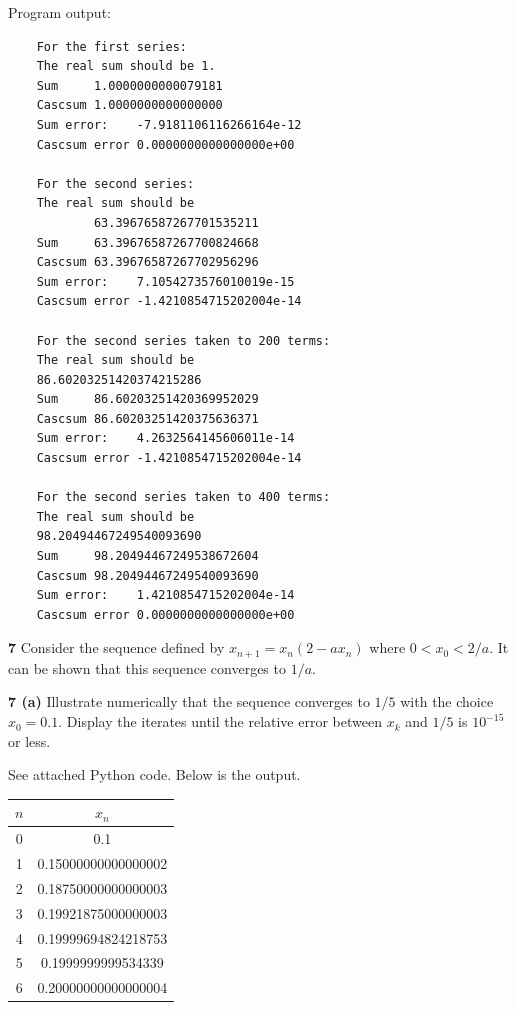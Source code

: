 \documentclass[12pt]{article}
\begin{document}
	\bigbreak
	
	Program output: \\
	\begin{verbatim}
	For the first series:
	The real sum should be 1.
	Sum     1.0000000000079181
	Cascsum 1.0000000000000000
	Sum error:    -7.9181106116266164e-12
	Cascsum error 0.0000000000000000e+00
	
	For the second series:
	The real sum should be
	        63.39676587267701535211
	Sum     63.39676587267700824668
	Cascsum 63.39676587267702956296
	Sum error:    7.1054273576010019e-15
	Cascsum error -1.4210854715202004e-14
	
	For the second series taken to 200 terms:
	The real sum should be
	86.60203251420374215286
	Sum     86.60203251420369952029
	Cascsum 86.60203251420375636371
	Sum error:    4.2632564145606011e-14
	Cascsum error -1.4210854715202004e-14
	
	For the second series taken to 400 terms:
	The real sum should be
	98.20494467249540093690
	Sum     98.20494467249538672604
	Cascsum 98.20494467249540093690
	Sum error:    1.4210854715202004e-14
	Cascsum error 0.0000000000000000e+00	
	\end{verbatim}


\hspace{-7 ex}\textbf{7} Consider the sequence defined by $x_{n+1} = x_n(2-ax_n)$ where $0<x_0<2/a$. It can be shown that this sequence converges to $1/a$.\bigbreak

\hspace{-7 ex}\textbf{7 (a)} Illustrate numerically that the sequence converges to $1/5$ with the choice $x_0 = 0.1$. Display the iterates until the relative error between $x_k$ and $1/5$ is $10^{-15}$ or less. \bigbreak

	See attached Python code. Below is the output.\\

	\begin{center}
		\begin{tabular}{|c|c|}
			\hline
			$n$&$x_n$\\ \hline
			0&0.1\\ \hline
			1&0.15000000000000002\\ \hline
			2&0.18750000000000003\\ \hline
			3&0.19921875000000003\\ \hline
			4&0.19999694824218753\\ \hline
			5&0.1999999999534339\\ \hline
			6&0.20000000000000004\\ \hline
		\end{tabular}
	\end{center}
	
\end{document}
